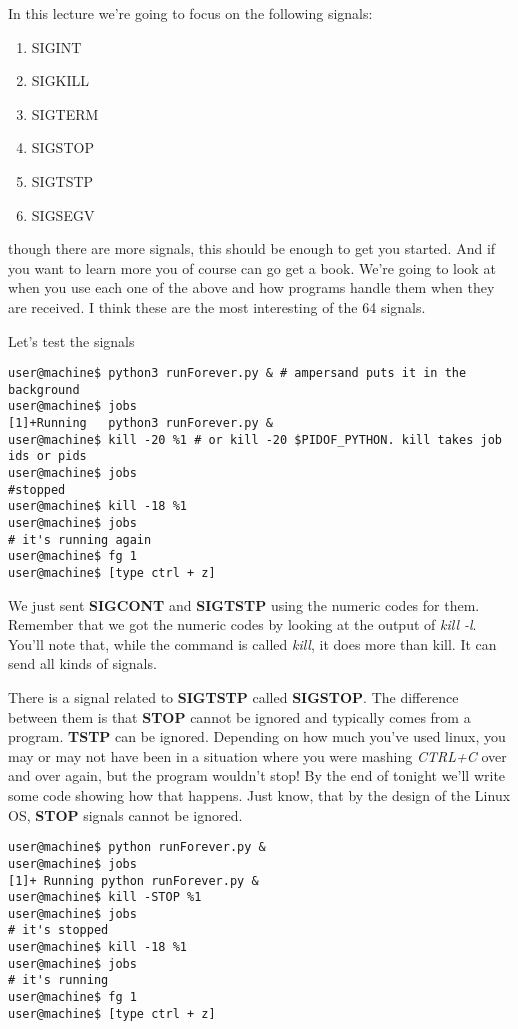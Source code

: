 \documentclass[12pt]{article}
\begin{document}
In this lecture we're going to focus on the following signals:

\begin{enumerate}
\item SIGINT
\item SIGKILL
\item SIGTERM
\item SIGSTOP
\item SIGTSTP
\item SIGSEGV
\end{enumerate}

though there are more signals, this should be enough to get you started. And if you want to learn more you of course can go get a book. We're going to look at when you use each one of the above and how programs handle them when they are received. I think these are the most interesting of the 64 signals.

Let's test the signals

\begin{lstlisting}
user@machine$ python3 runForever.py & # ampersand puts it in the background
user@machine$ jobs
[1]+Running   python3 runForever.py &
user@machine$ kill -20 %1 # or kill -20 $PIDOF_PYTHON. kill takes job ids or pids
user@machine$ jobs
#stopped
user@machine$ kill -18 %1
user@machine$ jobs
# it's running again
user@machine$ fg 1
user@machine$ [type ctrl + z]
\end{lstlisting}

We just sent \textbf{SIGCONT} and \textbf{SIGTSTP} using the numeric codes for them. Remember that we got the numeric codes by looking at the output of \textit{kill -l}. You'll note that, while the command is called \textit{kill}, it does more than kill. It can send all kinds of signals.

There is a signal related to \textbf{SIGTSTP} called \textbf{SIGSTOP}.
The difference between them is that \textbf{STOP} cannot be ignored and typically comes from a program. \textbf{TSTP} can be ignored. Depending on how much you've used linux, you may or may  not have been in a situation where you were mashing \textit{CTRL+C} over and over again, but the program wouldn't stop! By the end of tonight we'll write some code showing how that happens. Just know, that by the design of the Linux OS, \textbf{STOP} signals cannot be ignored.

\begin{lstlisting}
user@machine$ python runForever.py &
user@machine$ jobs
[1]+ Running python runForever.py &
user@machine$ kill -STOP %1
user@machine$ jobs
# it's stopped
user@machine$ kill -18 %1
user@machine$ jobs 
# it's running
user@machine$ fg 1
user@machine$ [type ctrl + z]
\end{lstlisting}
\end{document}
